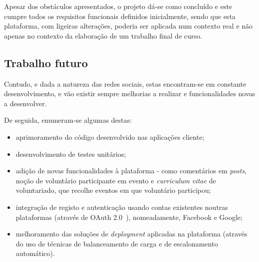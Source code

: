 \par \medskip

Apesar dos obstáculos apresentados, o projeto dá-se como concluído e este cumpre todos os requisitos funcionais definidos inicialmente, sendo que esta plataforma, com ligeiras alterações, poderia ser aplicada num contexto real e não apenas no contexto da elaboração de um trabalho final de curso. 

\newpage

\subsection{Trabalho futuro}

Contudo, e dada a natureza das redes sociais, estas encontram-se em constante desenvolvimento, e vão existir sempre melhorias a realizar e funcionalidades novas a desenvolver.

\par \medskip

De seguida, enumeram-se algumas destas:

\begin{itemize}
	\item aprimoramento do código desenvolvido nas aplicações cliente;
	\item desenvolvimento de testes unitários;
	\item adição de novas funcionalidades à plataforma - como comentários em \textit{posts}, noção de voluntário participante em evento e \textit{curriculum vitae} de voluntariado, que recolhe eventos em que voluntário participou;
	\item integração de registo e autenticação usando contas existentes noutras plataformas (através de OAuth 2.0~\cite{IETF2020}), nomeadamente, Facebook e Google; 
	\item melhoramento das soluções de \textit{deployment} aplicadas na plataforma (através do uso de técnicas de balanceamento de carga e de escalonamento automático).
\end{itemize}